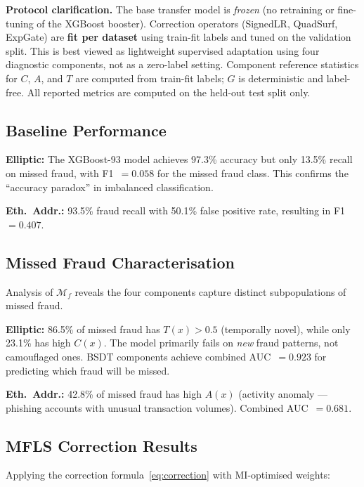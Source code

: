 \documentclass[journal]{IEEEtran}
\begin{document}
\textbf{Protocol clarification.} The base transfer model is \textit{frozen} (no retraining or fine-tuning of the XGBoost booster). Correction operators (SignedLR, QuadSurf, ExpGate) are \textbf{fit per dataset} using train-fit labels and tuned on the validation split. This is best viewed as lightweight supervised adaptation using four diagnostic components, not as a zero-label setting. Component reference statistics for $C$, $A$, and $T$ are computed from train-fit labels; $G$ is deterministic and label-free. All reported metrics are computed on the held-out test split only.

\subsection{Baseline Performance}
\label{ssec:baseline}

\textbf{Elliptic:} The XGBoost-93 model achieves 97.3\% accuracy but only 13.5\% recall on missed fraud, with F1~$= 0.058$ for the missed fraud class. This confirms the ``accuracy paradox'' in imbalanced classification.

\textbf{Eth.\ Addr.:} 93.5\% fraud recall with 50.1\% false positive rate, resulting in F1~$= 0.407$.

\subsection{Missed Fraud Characterisation}
\label{ssec:characterisation}

Analysis of $\mathcal{M}_f$ reveals the four components capture distinct subpopulations of missed fraud.

\textbf{Elliptic:} 86.5\% of missed fraud has $T(x) > 0.5$ (temporally novel), while only 23.1\% has high $C(x)$. The model primarily fails on \textit{new} fraud patterns, not camouflaged ones. BSDT components achieve combined AUC~$= 0.923$ for predicting which fraud will be missed.

\textbf{Eth.\ Addr.:} 42.8\% of missed fraud has high $A(x)$ (activity anomaly --- phishing accounts with unusual transaction volumes). Combined AUC~$= 0.681$.

\subsection{MFLS Correction Results}
\label{ssec:mfls_results}

Applying the correction formula~\eqref{eq:correction} with MI-optimised weights:
\end{document}
